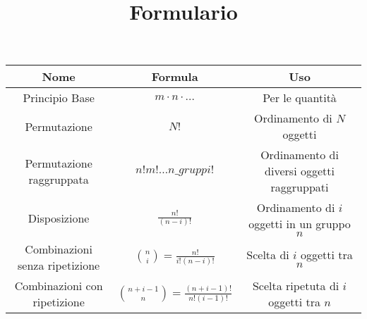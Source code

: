 \documentclass[12pt]{article}
\title{Formulario}
\author{}
\date{}
\begin{document}
\maketitle
\begin{center}
    \begin{tabular}{|c|c|c|}
        \hline
        \textbf{Nome} & \textbf{Formula} & \textbf{Uso} \\
        \hline
        Principio Base & $m\cdot n \cdot \ldots$ & Per le quantità \\
        \hline
        Permutazione & $N!$ & Ordinamento di $N$ oggetti\\
        \hline
        Permutazione raggruppata & $n!m!\ldots n\_gruppi!$ & Ordinamento di diversi oggetti raggruppati\\
        \hline
        Disposizione & $\frac{n!}{(n-i)!}$ & Ordinamento di $i$ oggetti in un gruppo $n$ \\
        \hline
        Combinazioni senza ripetizione & $\binom{n}{i}=\frac{n!}{i!(n-i)!}$ & Scelta di $i$ oggetti tra $n$\\
        \hline
        Combinazioni con ripetizione & $\binom{n+i-1}{n}=\frac{(n+i-1)!}{n!(i-1)!}$ & Scelta ripetuta di $i$ oggetti tra $n$\\
        \hline
    \end{tabular}
\end{center}
\end{document}
